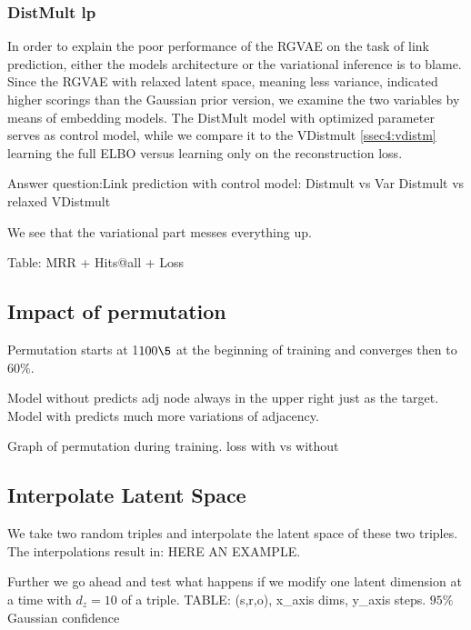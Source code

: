 



\subsubsection{DistMult lp}

In order to explain the poor performance of the RGVAE on the task of link prediction, either the models architecture or the variational inference is to blame. Since the RGVAE with relaxed latent space, meaning less variance, indicated higher scorings than the Gaussian prior version, we examine the two variables by means of embedding models. The DistMult model with optimized parameter serves as control model, while we compare it to the VDistmult \ref{ssec4:vdistm} learning the full ELBO versus learning only on the reconstruction loss.



Answer question:Link prediction with control model:
Distmult vs Var Distmult vs relaxed VDistmult

We see that the variational part messes everything up.

Table:
MRR + Hits@all + Loss

\subsection{Impact of permutation}

Permutation starts at 1$100\5$ at the beginning of training and converges then to $60\%$.

Model without predicts adj node always in the upper right just as the target. Model with predicts much more variations of adjacency.

Graph of permutation during training.
loss with vs without 

\subsection{Interpolate Latent Space}
We take two random triples and interpolate the latent space of these two triples. The interpolations result in: HERE AN EXAMPLE.

Further we go ahead and test what happens if we modify one latent dimension at a time with $d_z = 10$ of a triple. TABLE: (s,r,o), x_axis dims, y_axis steps. $95\%$ Gaussian confidence 

